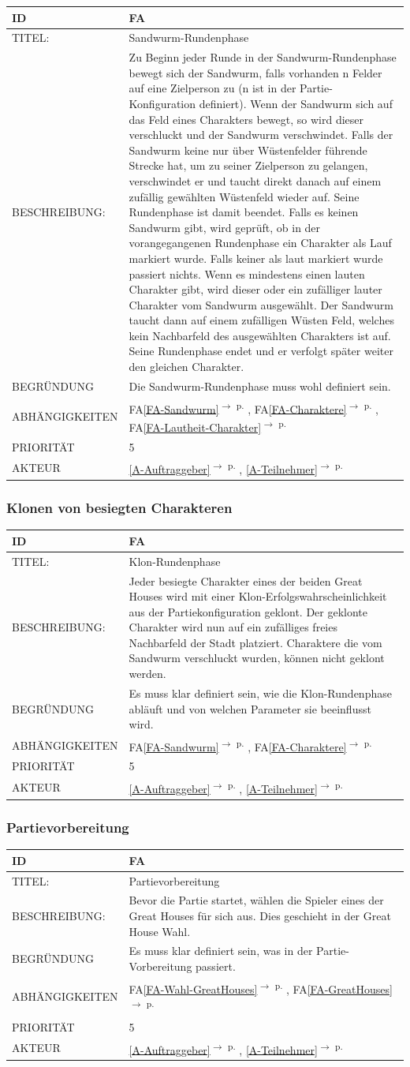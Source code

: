 \documentclass[12pt]{article}
\newcounter{fa}
\newcommand{\fa}[7]{
\refstepcounter{fa}\label{#7}
\begin{tabularx}{16cm}{l|X}
\textbf{ID} & \textbf{FA\arabic{fa}} \\
\hline
TITEL: & #1 \\
\hline
BESCHREIBUNG: & #2 \\
\hline
BEGRÜNDUNG & #3 \\ 
\hline
ABHÄNGIGKEITEN & #4\\ 
\hline 
PRIORITÄT & #5\\ 
\hline 
AKTEUR & #6
\end{tabularx}
}
\newcommand{\rref}[1]{\ref{#1}\textsuperscript{$\rightarrow$ p. \pageref{#1}}}
\newcommand{\faref}[1]{FA\ref{#1}\textsuperscript{$\rightarrow$ p. \pageref{#1}}}
\begin{document}
\fa{Sandwurm-Rundenphase}{ Zu Beginn jeder Runde in der Sandwurm-Rundenphase bewegt sich der Sandwurm, falls vorhanden n Felder auf eine Zielperson zu (n ist in der Partie-Konfiguration definiert). Wenn der Sandwurm sich auf das Feld eines Charakters bewegt, so wird dieser verschluckt und der Sandwurm verschwindet. Falls der Sandwurm keine nur über Wüstenfelder führende Strecke hat, um zu seiner Zielperson zu gelangen, verschwindet er und taucht direkt danach auf einem zufällig gewählten Wüstenfeld wieder auf. Seine Rundenphase ist damit beendet. Falls es keinen Sandwurm gibt, wird geprüft, ob in der vorangegangenen Rundenphase ein Charakter als Lauf markiert wurde. Falls keiner als laut markiert wurde passiert nichts. Wenn es mindestens einen lauten Charakter gibt, wird dieser oder ein zufälliger lauter Charakter vom Sandwurm ausgewählt. Der Sandwurm taucht dann auf einem zufälligen Wüsten Feld, welches kein Nachbarfeld des ausgewählten Charakters ist auf. Seine Rundenphase endet und er verfolgt später weiter den gleichen Charakter.}{Die Sandwurm-Rundenphase muss wohl definiert sein.}{\faref{FA-Sandwurm}, \faref{FA-Charaktere}, \faref{FA-Lautheit-Charakter}}{5}{\rref{A-Auftraggeber}, \rref{A-Teilnehmer}}{FA-Phase-Sandwurm}

\subsubsection*{Klonen von besiegten Charakteren}

\fa{Klon-Rundenphase}{Jeder besiegte Charakter eines der beiden Great Houses wird mit einer Klon-Erfolgswahrscheinlichkeit aus der Partiekonfiguration geklont. Der geklonte Charakter wird nun auf ein zufälliges freies Nachbarfeld der Stadt platziert. Charaktere die vom Sandwurm verschluckt wurden, können nicht geklont werden.}{Es muss klar definiert sein, wie die Klon-Rundenphase abläuft und von welchen Parameter sie beeinflusst wird.}{\faref{FA-Sandwurm}, \faref{FA-Charaktere}}{5}{\rref{A-Auftraggeber}, \rref{A-Teilnehmer}}{FA-Phase-Klon}

\subsubsection*{Partievorbereitung}

\fa{Partievorbereitung}{Bevor die Partie startet, wählen die Spieler eines der Great Houses für sich aus. Dies geschieht in der Great House Wahl.}{Es muss klar definiert sein, was in der Partie-Vorbereitung passiert. }{\faref{FA-Wahl-GreatHouses}, \faref{FA-GreatHouses}}{5}{\rref{A-Auftraggeber}, \rref{A-Teilnehmer}}{FA-Partievorbereitung}
\end{document}
